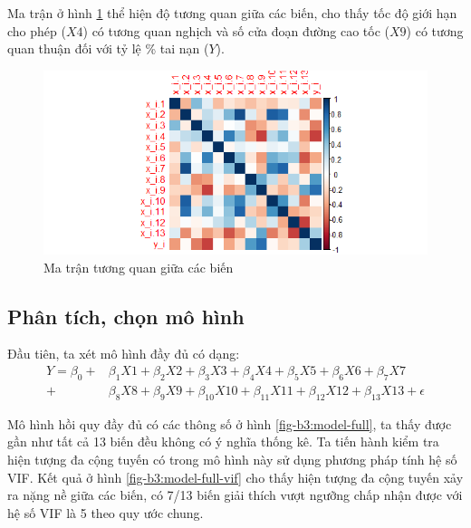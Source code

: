 Ma trận ở hình \ref{fig-b3:dataset-corr} thể hiện độ tương quan giữa các biến, cho thấy tốc độ giới hạn cho phép ($X4$) có tương quan nghịch và số cửa đoạn đường cao tốc ($X9$) có tương quan thuận đối với tỷ lệ \% tai nạn ($Y$).
\begin{figure}[H]
	\centering
	\includegraphics[width=0.9\linewidth]{images/B3/dataset-corr}
	\caption{Ma trận tương quan giữa các biến}
	\label{fig-b3:dataset-corr}
\end{figure}

\subsection*{Phân tích, chọn mô hình}
Đầu tiên, ta xét mô hình đầy đủ có dạng:
\begin{equation}\label{b3-model-full}
	\begin{split}
		Y = \beta_0 + &\beta_1X1 + \beta_2X2 + \beta_3X3 + \beta_4X4 + \beta_5X5 + \beta_6X6 + \beta_7X7\\ + &\beta_8X8 + \beta_9X9 + \beta_{10}X10 + \beta_{11}X11 + \beta_{12}X12 + \beta_{13}X13 + \epsilon
	\end{split}
\end{equation}

Mô hình hồi quy đầy đủ có các thông số ở hình \ref{fig-b3:model-full}, ta thấy được gần như tất cả 13 biến đều không có ý nghĩa thống kê. Ta tiến hành kiểm tra hiện tượng đa cộng tuyến có trong mô hình này sử dụng phương pháp tính hệ số VIF. Kết quả ở hình \ref{fig-b3:model-full-vif} cho thấy hiện tượng đa cộng tuyến xảy ra nặng nề giữa các biến, có 7/13 biến giải thích vượt ngưỡng chấp nhận được với hệ số VIF là 5 theo quy ước chung.

